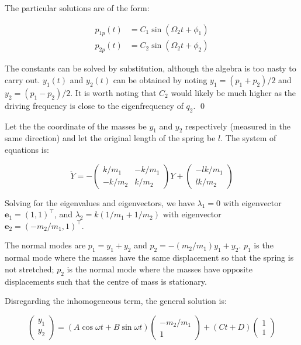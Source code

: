 \documentclass[12pt]{article}
\begin{document}
The particular solutions are of the form:

\begin{equation}
    \begin{split}
        p_{1p}(t) &= C_{1} \sin{(\Omega_{2}t + \phi_{1})} \\
        p_{2p}(t) &= C_{2} \sin{(\Omega_{2}t + \phi_{2})}
    \end{split}
\end{equation}

The constants can be solved by substitution, although the algebra is too nasty to carry out. $y_{1}(t)$ and $y_{2}(t)$ can be obtained by noting $y_{1} = (p_{1} + p_{2})/2$ and $y_{2} = (p_{1} - p_{2})/2$. It is worth noting that $C_{2}$ would likely be much higher as the driving frequency is close to the eigenfrequency of $q_{2}$.
\qed



Let the the coordinate of the masses be $y_{1}$ and $y_{2}$ respectively (measured in the same direction) and let the original length of the spring be $l$. The system of equations is:

\begin{equation}
    \ddot{Y} =
    -\begin{pmatrix}
        k/m_{1}  & -k/m_{1} \\
        -k/m_{2} & k/m_{2}
    \end{pmatrix}
    Y
    +
    \begin{pmatrix}
        -lk/m_{1} \\
        lk/m_{2}
    \end{pmatrix}
\end{equation}

Solving for the eigenvalues and eigenvectors, we have $\lambda_{1} = 0$ with eigenvector $\mathbf{e}_{1} = (1, 1)^{\intercal}$, and $\lambda_{2} = k(1/m_{1} + 1/m_{2})$ with eigenvector $\mathbf{e}_{2} = (-m_{2}/m_{1}, 1)^{\intercal}$.

The normal modes are $p_{1} = y_{1} + y_{2}$ and $p_{2} = -(m_{2}/m_{1})y_{1} + y_{2}$. $p_{1}$ is the normal mode where the masses have the same displacement so that the spring is not stretched; $p_{2}$ is the normal mode where the masses have opposite displacements such that the centre of mass is stationary.

Disregarding the inhomogeneous term, the general solution is:

\begin{equation}
    \begin{pmatrix}
        y_{1} \\
        y_{2}
    \end{pmatrix} =
    (A\cos{\omega t} + B\sin{\omega t})
    \begin{pmatrix}
        -m_{2}/m_{1} \\
        1
    \end{pmatrix}
    +
    (Ct + D)
    \begin{pmatrix}
        1 \\
        1
    \end{pmatrix}
\end{equation}
\end{document}
